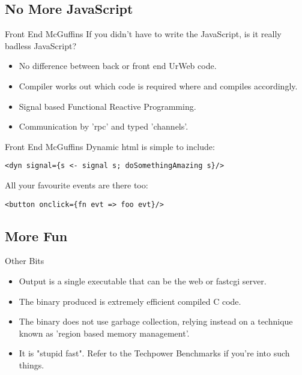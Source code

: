 \documentclass{beamer}
\begin{document}
\subsection{No More JavaScript}
\begin{frame}{Front End McGuffins}
If you didn't have to write the JavaScript, is it really badless JavaScript?\\

\begin{itemize}
\item No difference between back or front end UrWeb code.
\item Compiler works out which code is required where and compiles accordingly.
\item Signal based Functional Reactive Programming.
\item Communication by 'rpc' and typed 'channels'.
\end{itemize}
\end{frame}

\begin{frame}[fragile]{Front End McGuffins}
Dynamic html is simple to include:
\begin{verbatim}
<dyn signal={s <- signal s; doSomethingAmazing s}/>
\end{verbatim}
All your favourite events are there too:
\begin{verbatim}
<button onclick={fn evt => foo evt}/>
\end{verbatim}
\end{frame}

\subsection{More Fun}
\begin{frame}[fragile]{Other Bits}

\begin{itemize}
\item Output is a single executable that can be the web or fastcgi server.
\item The binary produced is extremely efficient compiled C code.
\item The binary does not use garbage collection, relying instead on a technique known as 'region based memory management'.
\item It is "stupid fast". Refer to the Techpower Benchmarks if you're into such things.
\end{itemize}
\end{frame}
\end{document}
